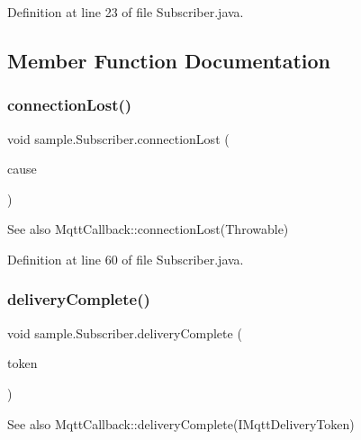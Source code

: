 Definition at line 23 of file Subscriber.\+java.



\subsection{Member Function Documentation}
\mbox{\label{classsample_1_1_subscriber_a9f39d5a464ae51c85400004c6f0b32ed}} 
\subsubsection{\texorpdfstring{connection\+Lost()}{connectionLost()}}
{\footnotesize\ttfamily void sample.\+Subscriber.\+connection\+Lost (\begin{DoxyParamCaption}\item[{Throwable}]{cause }\end{DoxyParamCaption})\hspace{0.3cm}{\ttfamily [inline]}}

\begin{DoxySeeAlso}{See also}
Mqtt\+Callback\+::connection\+Lost(\+Throwable) 
\end{DoxySeeAlso}


Definition at line 60 of file Subscriber.\+java.

\mbox{\label{classsample_1_1_subscriber_a3eb4c82798dcb29cc581c3aabab34107}} 
\subsubsection{\texorpdfstring{delivery\+Complete()}{deliveryComplete()}}
{\footnotesize\ttfamily void sample.\+Subscriber.\+delivery\+Complete (\begin{DoxyParamCaption}\item[{I\+Mqtt\+Delivery\+Token}]{token }\end{DoxyParamCaption})\hspace{0.3cm}{\ttfamily [inline]}}

\begin{DoxySeeAlso}{See also}
Mqtt\+Callback\+::delivery\+Complete(\+I\+Mqtt\+Delivery\+Token) 
\end{DoxySeeAlso}


